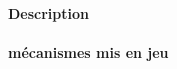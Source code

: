 \paragraph{Description} %
\label{par:description_groel}

 \cite{stoll2009}

\paragraph{mécanismes mis en jeu} %
\label{par:process_groel}

